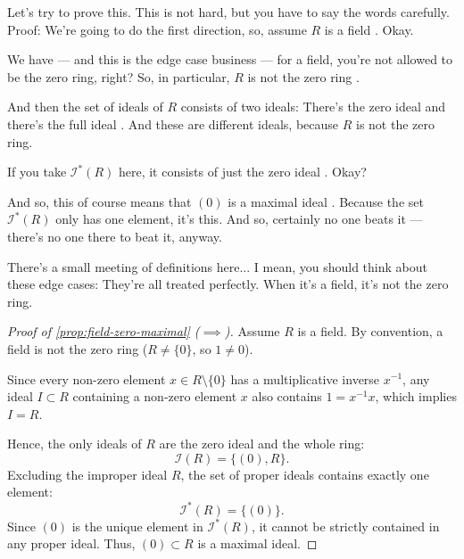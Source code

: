 \begin{speech}[00:13:28 - 00:14:48]
Let's try to prove this. This is not hard, but you have to say the words carefully. Proof: We're going to do the first direction, so, assume $R$ is a field . Okay.

We have --- and this is the edge case business --- for a field, you're not allowed to be the zero ring, right? So, in particular, $R$ is not the zero ring .

And then the set of ideals of $R$ consists of two ideals: There's the zero ideal and there's the full ideal . And these are different ideals, because $R$ is not the zero ring.

If you take $\mathscr{I}^*(R)$ here, it consists of just the zero ideal . Okay?

And so, this of course means that $(0)$ is a maximal ideal . Because the set $\mathscr{I}^*(R)$ only has one element, it's this. And so, certainly no one beats it --- there's no one there to beat it, anyway.

There's a small meeting of definitions here... I mean, you should think about these edge cases: They're all treated perfectly. When it's a field, it's not the zero ring.
\end{speech}

\begin{content}
\begin{proof}[Proof of \cref{prop:field-zero-maximal} ($\implies$)]
Assume $R$ is a field. By convention, a field is not the zero ring ($R \neq \{0\}$, so $1 \neq 0$).

Since every non-zero element $x \in R \setminus \{0\}$ has a multiplicative inverse $x^{-1}$, any ideal $I \subset R$ containing a non-zero element $x$ also contains $1 = x^{-1} x$, which implies $I = R$. 

Hence, the only ideals of $R$ are the zero ideal and the whole ring:
\begin{equation}\label{eq:field-ideals-w5}
\mathscr{I}(R) = \{ (0), R \}.
\end{equation}
Excluding the improper ideal $R$, the set of proper ideals contains exactly one element:
\begin{equation}\label{eq:field-proper-ideals}
\mathscr{I}^*(R) = \{ (0) \}.
\end{equation}
Since $(0)$ is the unique element in $\mathscr{I}^*(R)$, it cannot be strictly contained in any proper ideal. Thus, $(0) \subset R$ is a maximal ideal.
\end{proof}
\end{content}

